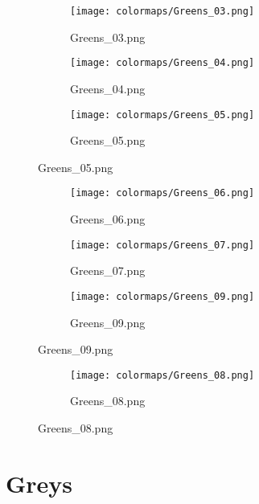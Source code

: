 \documentclass{article}%
\begin{document}
\begin{figure}[h!]%
\begin{subfigure}[b]{0.3\linewidth}%
\texttt{[image: colormaps/Greens\_03.png]}%
\caption{Greens\_03.png}%
\end{subfigure}%
\begin{subfigure}[b]{0.3\linewidth}%
\texttt{[image: colormaps/Greens\_04.png]}%
\caption{Greens\_04.png}%
\end{subfigure}%
\begin{subfigure}[b]{0.3\linewidth}%
\texttt{[image: colormaps/Greens\_05.png]}%
\caption{Greens\_05.png}%
\end{subfigure}%
\end{figure}

%
\hspace{1cm}\hfill%
\hspace{1cm}\hfill%
\hspace{1cm}\hfill%


\begin{figure}[h!]%
\begin{subfigure}[b]{0.3\linewidth}%
\texttt{[image: colormaps/Greens\_06.png]}%
\caption{Greens\_06.png}%
\end{subfigure}%
\begin{subfigure}[b]{0.3\linewidth}%
\texttt{[image: colormaps/Greens\_07.png]}%
\caption{Greens\_07.png}%
\end{subfigure}%
\begin{subfigure}[b]{0.3\linewidth}%
\texttt{[image: colormaps/Greens\_09.png]}%
\caption{Greens\_09.png}%
\end{subfigure}%
\end{figure}

%
\hspace{1cm}\hfill%


\begin{figure}[h!]%
\begin{subfigure}[b]{0.3\linewidth}%
\texttt{[image: colormaps/Greens\_08.png]}%
\caption{Greens\_08.png}%
\end{subfigure}%
\end{figure}

%
\newpage%
\section{Greys}%
\label{sec:Greys}%
\hspace{1cm}\hfill%
\hspace{1cm}\hfill%
\hspace{1cm}\hfill%
\end{document}
